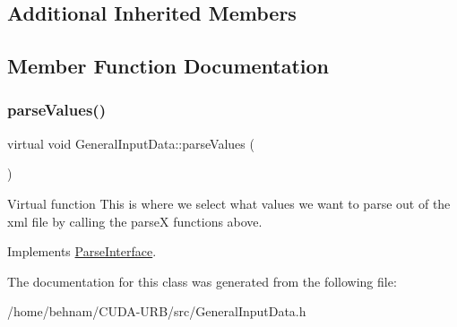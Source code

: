 \subsection*{Additional Inherited Members}


\subsection{Member Function Documentation}
\mbox{\label{classGeneralInputData_a674714bd018eea1a601ae9c4b8212c4a}} 
\subsubsection{\texorpdfstring{parse\+Values()}{parseValues()}}
{\footnotesize\ttfamily virtual void General\+Input\+Data\+::parse\+Values (\begin{DoxyParamCaption}{ }\end{DoxyParamCaption})\hspace{0.3cm}{\ttfamily [pure virtual]}}

Virtual function This is where we select what values we want to parse out of the xml file by calling the parseX functions above. 

Implements \hyperlink{classParseInterface_afca32108192ba0997c9e5a78189b0cbc}{Parse\+Interface}.



The documentation for this class was generated from the following file\+:\begin{DoxyCompactItemize}
\item 
/home/behnam/\+C\+U\+D\+A-\/\+U\+R\+B/src/General\+Input\+Data.\+h\end{DoxyCompactItemize}
